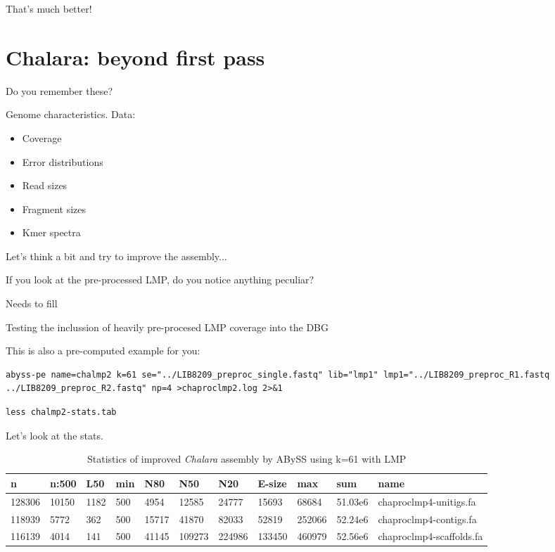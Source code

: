 That's much better!

\section{Chalara: beyond first pass}
Do you remember these?

Genome characteristics.
Data:
\begin{itemize}
 \item Coverage
 \item Error distributions
 \item Read sizes
 \item Fragment sizes
 \item Kmer spectra
\end{itemize}

Let's think a bit and try to improve the assembly...

\begin{questions}
If you look at the pre-processed LMP, do you notice anything peculiar?
\begin{answer}
Needs to fill
\end{answer}
\end{questions}
\begin{steps}
Testing the inclussion of heavily pre-procesed LMP coverage into the DBG
\begin{warning}
This is also a pre-computed example for you:
\begin{lstlisting}
abyss-pe name=chalmp2 k=61 se="../LIB8209_preproc_single.fastq" lib="lmp1" lmp1="../LIB8209_preproc_R1.fastq ../LIB8209_preproc_R2.fastq" np=4 >chaproclmp2.log 2>&1
\end{lstlisting}
\end{warning}
\begin{lstlisting}
less chalmp2-stats.tab
\end{lstlisting}

\end{steps}
Let's look at the stats.
\begin{table}[H]
\small
  \centering
  \caption{Statistics of improved \textit{Chalara} assembly by ABySS using k=61 with LMP}
    \begin{tabular}{lllllllllll}
    \toprule
    \textbf{n} & \textbf{n:500} & \textbf{L50} & \textbf{min} & \textbf{N80}& \textbf{N50}& \textbf{N20}& \textbf{E-size}& \textbf{max} & \textbf{sum}& \textbf{name}\\
    \midrule
	128306  & 10150  & 1182  & 500  & 4954   & 12585   & 24777   & 15693   & 68684   & 51.03e6  & chaproclmp4-unitigs.fa \\
	118939  & 5772   & 362   & 500  & 15717  & 41870   & 82033   & 52819   & 252066  & 52.24e6  & chaproclmp4-contigs.fa \\
	116139  & 4014   & 141   & 500  & 41145  & 109273  & 224986  & 133450  & 460979  & 52.56e6  & chaproclmp4-scaffolds.fa \\
    \bottomrule
    \end{tabular}
  \label{tab:chaklmp2-k61}
\end{table}

